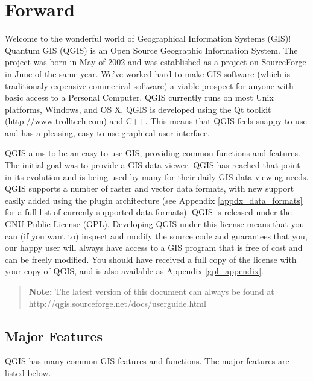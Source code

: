 \chapter{Forward}

Welcome to the wonderful world of Geographical Information Systems (GIS)!
Quantum GIS (QGIS) is an Open Source Geographic Information System. The project
was born in May of 2002 and was established as a project on SourceForge in June
of the same year. We've worked hard to make GIS software (which is traditionaly
expensive commerical software) a viable prospect for anyone with basic access
to a Personal Computer. QGIS currently runs on most Unix platforms, Windows, and
OS X. QGIS is developed using the Qt toolkit (\url{http://www.trolltech.com})
and C++. This means that QGIS feels snappy to use and has a pleasing, easy to
use graphical user interface. 

QGIS aims to be an easy to use GIS, providing common functions and features.
The initial goal was to provide a GIS data viewer. QGIS has reached that point
in its evolution and is being used by many for their daily GIS data viewing
needs. QGIS supports a number of raster and vector data formats, with new
support easily added using the plugin architecture (see Appendix
\ref{appdx_data_formats} for a full list of currenly supported data formats).
QGIS is released under the GNU Public License (GPL). Developing QGIS under this
license means that you can (if you want to) inspect and modify the source code
and guarantees that you, our happy user will always have access to a GIS
program that is free of cost and can be freely modified. You should have
received a full copy of the license with your copy of QGIS, and is also
available as Appendix \ref{gpl_appendix}.  
\begin{quote}
\begin{center}
\textbf{Note:} The latest version of this document can always be found at \newline
http://qgis.sourceforge.net/docs/userguide.html 
\end{center}
\end{quote}

\section{Major Features}

QGIS has many common GIS features and functions. The major features
are listed below. 

